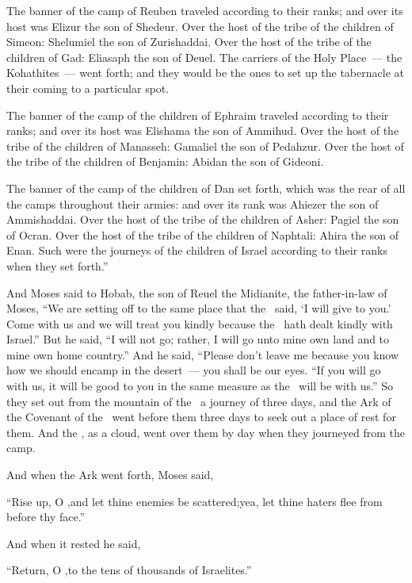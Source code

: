 \begin{inparaenum}
   The banner of the camp of Reuben traveled according to their ranks; and over its host was Elizur the son of Shedeur.%
   Over the host of the tribe of the children of Simeon: Shelumiel the son of Zurishaddai.%
   Over the host of the tribe of the children of Gad: Eliasaph the son of Deuel.%
   The carriers of the Holy Place~--- the Kohathites~--- went forth; and they would be the ones to set up the tabernacle at their coming to a particular spot.%

   The banner of the camp of the children of Ephraim traveled according to their ranks; and over its host was Elishama the son of Ammihud.%
   Over the host of the tribe of the children of Manasseh: Gamaliel the son of Pedahzur.%
   Over the host of the tribe of the children of Benjamin: Abidan the son of Gideoni.%

   The banner of the camp of the children of Dan set forth, which was the rear of all the camps throughout their armies: and over its rank was Ahiezer the son of Ammishaddai.%
   Over the host of the tribe of the children of Asher: Pagiel the son of Ocran.%
   Over the host of the tribe of the children of Naphtali: Ahira the son of Enan.%
   Such were the journeys of the children of Israel according to their ranks when they set forth.''%

   And Moses said to Hobab, the son of Reuel the Midianite, the father-in-law of Moses, ``We are setting off to the same place that the \lord\ said, `I will give to you.' Come with us and we will treat you kindly because the \lord\ hath dealt kindly with Israel.''%
   But he said, ``I will not go; rather, I will go unto mine own land and to mine own home country.''%
   And he said, ``Please don't leave me because you know how we should encamp in the desert~--- you shall be our eyes.%
   ``If you will go with us, it will be good to you in the same measure as the \lord\ will be with us.''%
   So they set out from the mountain of the \lord\ a journey of three days, and the Ark of the Covenant of the \lord\ went before them three days to seek out a place of rest for them.%
   And the \lord, as a cloud, went over them by day when they journeyed from the camp.%

   And when the Ark went forth, Moses said,\smallskip%

  \pa{}``Rise up, O \lord,\pa{}and let thine enemies be scattered;\pa{}yea, let thine haters flee from before thy face.''%

  \noindent{} And when it rested he said,\smallskip%

  \pa{}``Return, O \lord,\pa{}to the tens of thousands of Israelites.''%
\end{inparaenum}
